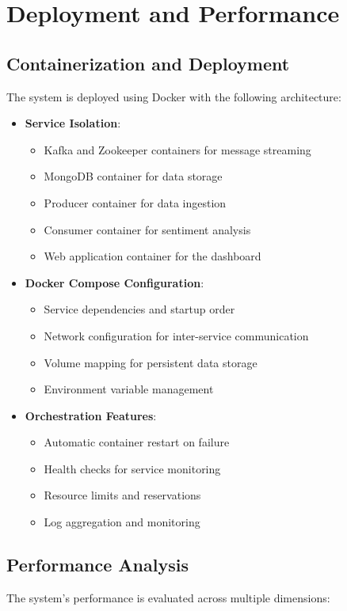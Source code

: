 \documentclass[11pt,a4paper,twocolumn]{article}
\begin{document}
\section{Deployment and Performance}
\subsection{Containerization and Deployment}
The system is deployed using Docker with the following architecture:
\begin{itemize}
    \item \textbf{Service Isolation}:
    \begin{itemize}
        \item Kafka and Zookeeper containers for message streaming
        \item MongoDB container for data storage
        \item Producer container for data ingestion
        \item Consumer container for sentiment analysis
        \item Web application container for the dashboard
    \end{itemize}
    
    \item \textbf{Docker Compose Configuration}:
    \begin{itemize}
        \item Service dependencies and startup order
        \item Network configuration for inter-service communication
        \item Volume mapping for persistent data storage
        \item Environment variable management
    \end{itemize}
    
    \item \textbf{Orchestration Features}:
    \begin{itemize}
        \item Automatic container restart on failure
        \item Health checks for service monitoring
        \item Resource limits and reservations
        \item Log aggregation and monitoring
    \end{itemize}
\end{itemize}

\subsection{Performance Analysis}
The system's performance is evaluated across multiple dimensions:
\end{document}
